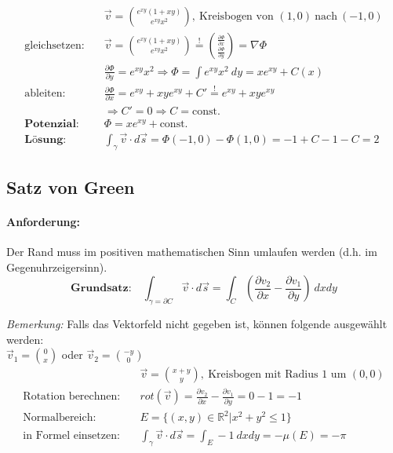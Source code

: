 \documentclass[11pt]{article}
\begin{document}
\begin{equation*}
\begin{split}
	& \vec{v} = \binom{e^{xy}(1 + xy)}{e^{xy}x^2},\ \text{Kreisbogen von } (1,0)\ \text{nach}\ (-1,0) \\
	\text{gleichsetzen:}\quad & \vec{v} = \binom{e^{xy}(1 + xy)}{e^{xy}x^2} \overset{!}{=} \binom{\frac{\partial\Phi}{\partial x}}{\frac{\partial\Phi}{\partial y}} = \nabla\Phi \\
	& \frac{\partial\Phi}{\partial y} = e^{xy}x^2 \Rightarrow \Phi = \int e^{xy}x^2\ dy = xe^{xy} + C(x) \\
	\text{ableiten:}\quad & \frac{\partial\Phi}{\partial x} = e^{xy} + xye^{xy} + C' \overset{!}{=} e^{xy} + xye^{xy} \\
	& \Rightarrow C' = 0 \Rightarrow C = \text{const.} \\
	\textbf{Potenzial:}\quad & \Phi = xe^{xy} + \text{const.} \\
	\textbf{L{\"o}sung:}\quad & \int_\gamma \vec{v} \cdot d\vec{s} = \Phi(-1,0) - \Phi(1,0) = -1 + C -1 - C = 2
\end{split}
\end{equation*}

\subsection{Satz von Green}

\paragraph{Anforderung:} Der Rand muss im positiven mathematischen Sinn umlaufen werden (d.h. im Gegenuhrzeigersinn).
\begin{equation*}
	\textbf{Grundsatz:}\quad\int_{\gamma = \partial C} \vec{v} \cdot d\vec{s} = \int_C (\frac{\partial v_2}{\partial x}-\frac{\partial v_1}{\partial y})\ dxdy
\end{equation*}

\emph{Bemerkung:} Falls das Vektorfeld nicht gegeben ist, k{\"o}nnen folgende ausgew{\"a}hlt werden: \\ 
$\vec{v}_1 = \binom{0}{x}$ oder $\vec{v}_2 = \binom{-y}{0}$ \\

\begin{equation*}
\begin{split}
	& \vec{v} = \binom{x+y}{y},\ \text{Kreisbogen mit Radius $1$ um $(0,0)$} \\
	\text{Rotation berechnen:}\quad & rot(\vec{v}) = \frac{\partial v_2}{\partial x}-\frac{\partial v_1}{\partial y} = 0 -1 = -1 \\
	\text{Normalbereich:}\quad & E = \{(x,y) \in \mathbb{R}^2 | x^2 + y^2 \leq 1 \} \\
	\text{in Formel einsetzen:}\quad & \int_\gamma \vec{v} \cdot d\vec{s} = \int_E -1\ dxdy = -\mu(E) = -\pi
\end{split}
\end{equation*}
\end{document}
